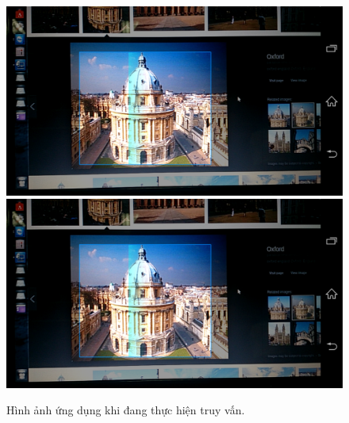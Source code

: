 {\begin{figure}[!htbp]
  \begin{center}
    \leavevmode
    \ifpdf
      \includegraphics[scale=0.17]{processing}
    \else
      \includegraphics[scale=0.17]{processing}
    \fi
    \caption[Hình ảnh ứng dụng khi đang thực hiện truy vấn]{Hình ảnh ứng dụng khi đang thực hiện truy vấn.}
    \label{FigProcessing}
  \end{center}
\end{figure}

}

